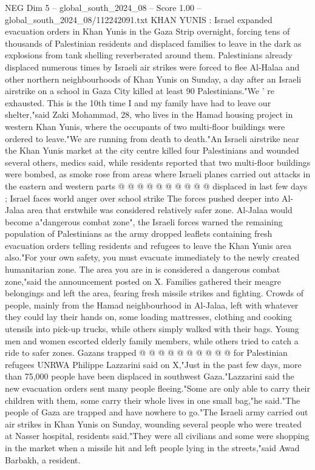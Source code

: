 \begin{textsample}{NEG Dim 5 – global\_south\_2024\_08 – Score 1.00 – global\_south\_2024\_08/112242091.txt}  \label{ex:f5_neg_128}
KHAN YUNIS : Israel expanded evacuation orders in Khan Yunis in the Gaza Strip overnight, forcing tens of thousands of Palestinian residents and displaced families to leave in the dark as explosions from tank shelling reverberated around them.
Palestinians already displaced numerous times by Israeli air strikes were forced to flee Al-Halaa and other northern neighbourhoods of Khan Yunis on Sunday, a day after an Israeli airstrike on a school in Gaza City killed at least 90 Palestinians."We ' re exhausted.
This is the 10th time I and my family have had to leave our shelter,"said Zaki Mohammad, 28, who lives in the Hamad housing project in western Khan Yunis, where the occupants of two multi-floor buildings were ordered to leave."We are running from death to death."An Israeli airstrike near the Khan Yunis market at the city centre killed four Palestinians and wounded several others, medics said, while residents reported that two multi-floor buildings were bombed, as smoke rose from areas where Israeli planes carried out attacks in the eastern and western parts @ @ @ @ @ @ @ @ @ @ displaced in last few days ; Israel faces world anger over school strike The forces pushed deeper into Al-Jalaa area that erstwhile was considered relatively safer zone.
Al-Jalaa would become a"dangerous combat zone", the Israeli forces warned the remaining population of Palestinians as the army dropped leaflets containing fresh evacuation orders telling residents and refugees to leave the Khan Yunis area also."For your own safety, you must evacuate immediately to the newly created humanitarian zone.
The area you are in is considered a dangerous combat zone,"said the announcement posted on X.
Families gathered their meagre belongings and left the area, fearing fresh missile strikes and fighting.
Crowds of people, mainly from the Hamad neighbourhood in Al-Jalaa, left with whatever they could lay their hands on, some loading mattresses, clothing and cooking utensils into pick-up trucks, while others simply walked with their bags.
Young men and women escorted elderly family members, while others tried to catch a ride to safer zones.
Gazans trapped @ @ @ @ @ @ @ @ @ @ for Palestinian refugees UNRWA Philippe Lazzarini said on X,"Just in the past few days, more than 75,000 people have been displaced in southwest Gaza."Lazzarini said the new evacuation orders sent many people fleeing."Some are only able to carry their children with them, some carry their whole lives in one small bag,"he said."The people of Gaza are trapped and have nowhere to go."The Israeli army carried out air strikes in Khan Yunis on Sunday, wounding several people who were treated at Nasser hospital, residents said."They were all civilians and some were shopping in the market when a missile hit and left people lying in the streets,"said Awad Barbakh, a resident.

\end{textsample}
